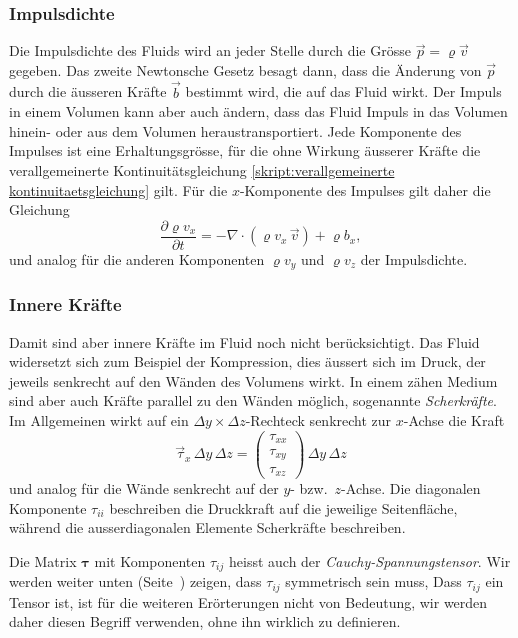 \subsubsection{Impulsdichte}
Die Impulsdichte des Fluids wird an jeder Stelle durch die Grösse
$\vec{p}=\varrho\vec{v}$ gegeben.
Das zweite Newtonsche Gesetz besagt dann, dass die Änderung von $\vec p$
durch die äusseren Kräfte $\vec{b}$ bestimmt wird, die auf das Fluid wirkt.
Der Impuls in einem Volumen kann aber auch ändern, dass das Fluid Impuls
in das Volumen hinein- oder aus dem Volumen heraustransportiert.
Jede Komponente des Impulses ist eine Erhaltungsgrösse, für die ohne
Wirkung äusserer Kräfte die verallgemeinerte Kontinuitätsgleichung
\eqref{skript:verallgemeinerte kontinuitaetsgleichung}
gilt.
Für die $x$-Komponente des Impulses gilt daher die Gleichung
\[
\frac{\partial \varrho v_x}{\partial t}
=
-\nabla \cdot(\varrho v_x\,\vec{v})
+\varrho b_x,
\]
und analog für die anderen Komponenten $\varrho v_y$ und $\varrho v_z$ 
der Impulsdichte.

\subsubsection{Innere Kräfte}
Damit sind aber innere Kräfte im Fluid noch nicht berücksichtigt.
Das Fluid widersetzt sich zum Beispiel der Kompression, dies äussert
sich im Druck, der jeweils senkrecht auf den Wänden des Volumens wirkt.
In einem zähen Medium sind aber auch Kräfte parallel zu den Wänden
möglich, sogenannte {\em Scherkräfte}.
Im Allgemeinen wirkt auf ein $\Delta y\times\Delta z$-Rechteck senkrecht
zur $x$-Achse die Kraft
\[
\vec{\tau}_x
\,\Delta y\,\Delta z
=
\begin{pmatrix}
\tau_{xx}\\
\tau_{xy}\\
\tau_{xz}
\end{pmatrix}
\,\Delta y\,\Delta z
\]
und analog für die Wände senkrecht auf der $y$- bzw.~$z$-Achse.
Die diagonalen Komponente $\tau_{ii}$ beschreiben die Druckkraft
auf die jeweilige Seitenfläche, während die ausserdiagonalen Elemente
Scherkräfte beschreiben.

Die Matrix $\bm{\tau}$ mit Komponenten $\tau_{ij}$ heisst auch der
{\em Cauchy-Spannungstensor}.
Wir werden weiter unten (Seite~\pageref{skript:spannungstensor symmetrisch})
zeigen, dass $\tau_{ij}$ symmetrisch sein muss,
Dass $\tau_{ij}$ ein Tensor ist, ist für die weiteren Erörterungen nicht
von Bedeutung, wir werden daher diesen Begriff verwenden, ohne ihn wirklich
zu definieren.

